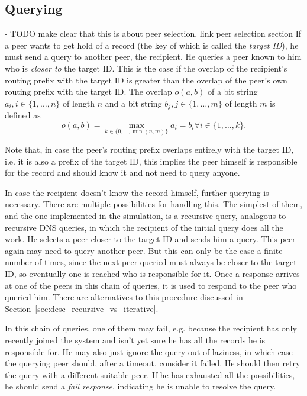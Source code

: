 \subsection{Querying}
\label{sec:desc_querying}
- TODO make clear that this is about peer selection, link peer selection section
If a peer wants to get hold of a record (the key of which is called the
\emph{target ID}), he must send a query to another peer, the recipient. He
queries a peer known to him who is \emph{closer to} the target ID. This is the
case if the overlap of the recipient's routing prefix with the target ID is
greater than the overlap of the peer's own routing prefix with the target ID.
The overlap $o(a, b)$ of a bit string $a_i, i \in \{1, \ldots, n\}$ of length
$n$ and a bit string $b_j, j \in \{1, \ldots, m\}$ of length $m$ is defined as
\[o(a, b) = \max_{k \in \{0, \ldots, \min(n, m)\}} a_i = b_i \forall i \in \{1,
\ldots, k\}.\]

Note that, in case the peer's routing prefix overlaps entirely with the target
ID, i.e. it is also a prefix of the target ID, this implies the peer himself is
responsible for the record and should know it and not need to query anyone.

In case the recipient doesn't know the record himself, further querying is
necessary. There are multiple possibilities for handling this. The simplest of
them, and the one implemented in the simulation, is a recursive query, analogous
to recursive DNS queries, in which the recipient of the initial query does all
the work. He selects a peer closer to the target ID and sends him a query. This
peer again may need to query another peer. But this can only be the case a
finite number of times, since the next peer queried must always be closer to the
target ID, so eventually one is reached who is responsible for it. Once a
response arrives at one of the peers in this chain of queries, it is used to
respond to the peer who queried him. There are alternatives to this procedure
discussed in Section~\ref{sec:desc_recursive_vs_iterative}.

In this chain of queries, one of them may fail, e.g. because the recipient has
only recently joined the system and isn't yet sure he has all the records he is
responsible for. He may also just ignore the query out of laziness, in which
case the querying peer should, after a timeout, consider it failed. He should
then retry the query with a different suitable peer. If he has exhausted all the
possibilities, he should send a \emph{fail response}, indicating he is unable to
resolve the query.

